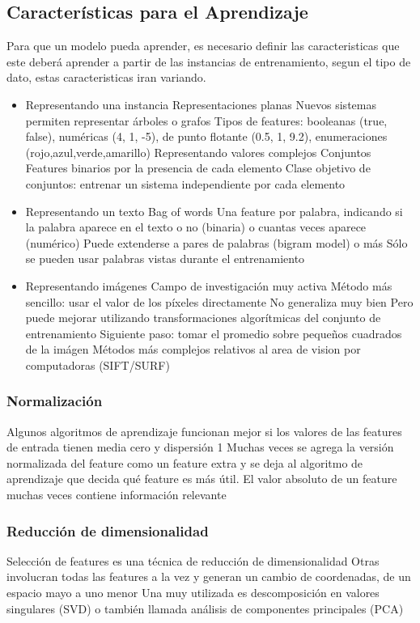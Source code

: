 \documentclass[a4paper,12pt,spanish]{book}
\begin{document}
    \subsection{Características para el Aprendizaje}
      Para que un modelo pueda aprender, es necesario definir las caracteristicas que este deberá aprender a partir de las instancias de entrenamiento, segun el tipo de dato, estas
      caracteristicas iran variando.
      \begin{itemize}
	\item Representando una instancia
	  Representaciones planas
	  Nuevos sistemas permiten representar árboles o grafos
	  Tipos de features: booleanas (true, false), numéricas (4, 1, -5), de punto flotante (0.5, 1, 9.2), enumeraciones (rojo,azul,verde,amarillo)
	  Representando valores complejos
	  Conjuntos
	  Features binarios por la presencia de cada elemento
	Clase objetivo de conjuntos: entrenar un sistema independiente por cada elemento
	\item Representando un texto
	  \subitem Bag of words
	  \subitem Una feature por palabra, indicando si la palabra aparece en el texto o no (binaria) o cuantas veces aparece (numérico)
	  \subitem Puede extenderse a pares de palabras (bigram model) o más
	  \subitem Sólo se pueden usar palabras vistas durante el entrenamiento
	\item Representando imágenes
	  \subitem Campo de investigación muy activa
	  \subitem Método más sencillo: usar el valor de los píxeles directamente
	  \subitem No generaliza muy bien
	  \subitem Pero puede mejorar utilizando transformaciones algorítmicas del conjunto de entrenamiento
	  \subitem Siguiente paso: tomar el promedio sobre pequeños cuadrados de la imágen
	  \subitem Métodos más complejos relativos al area de vision por computadoras (SIFT/SURF)
      \end{itemize}


      \subsubsection{Normalización}
	Algunos algoritmos de aprendizaje funcionan mejor si los valores de las features de entrada tienen media cero y dispersión 1
	Muchas veces se agrega la versión normalizada del feature como un feature extra y se deja al algoritmo de aprendizaje que decida qué feature es más útil.
	El valor absoluto de un feature muchas veces contiene información relevante

      \subsubsection{Reducción de dimensionalidad}
	Selección de features es una técnica de reducción de dimensionalidad
	Otras involucran todas las features a la vez y generan un cambio de coordenadas, de un espacio mayo a uno menor
	Una muy utilizada es descomposición en valores singulares (SVD) o también llamada análisis de componentes principales (PCA)
\end{document}

